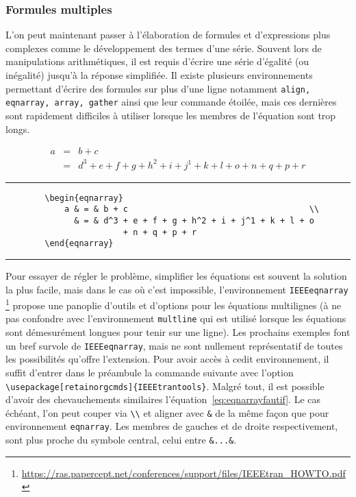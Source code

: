 \subsubsection*{Formules multiples}
L'on peut maintenant passer à l'élaboration de formules et d'expressions plus complexes comme le développement des termes d'une série. Souvent lors de manipulations arithmétiques, il est requis d'écrire une série d'égalité (ou inégalité) jusqu'à la réponse simplifiée. Il existe plusieurs environnements permettant d'écrire des formules sur plus d'une ligne notamment \verb|align, eqnarray, array, gather| ainsi que leur commande étoilée, mais ces dernières sont rapidement difficiles à utiliser lorsque les membres de l'équation sont trop longs.
%
\begin{table}[H]
	\centering
	\begin{eqnarray}
		a & = & b + c     \\
		  & = & d^3 + e + f + g + h^2 + i + j^1 + k + l + o
			      + n + q + p + r
	\label{eq:eqnarrayfautif}
	\end{eqnarray}
	\hrule
	\begin{verbatim}
		\begin{eqnarray}
			a & = & b + c                                     \\
			  & = & d^3 + e + f + g + h^2 + i + j^1 + k + l + o
					    + n + q + p + r
		\end{eqnarray}		
	\end{verbatim}
	\hrule
\end{table}
%
\par Pour essayer de régler le problème, simplifier les équations est souvent la solution la plus facile, mais dans le cas où c'est impossible, l'environnement \verb|IEEEeqnarray| \footnote{\url{https://ras.papercept.net/conferences/support/files/IEEEtran_HOWTO.pdf}} propose une panoplie d'outils et d'options pour les équations multilignes (à ne pas confondre avec l'environnement \verb|multline| qui est utilisé lorsque les équations sont démesurément longues pour tenir sur une ligne). Les prochains exemples font un bref survole de \verb|IEEEeqnarray|, mais ne sont nullement représentatif de toutes les possibilités qu'offre l'extension. Pour avoir accès à cedit environnement, il suffit d'entrer dans le préambule la commande suivante avec l'option \verb|\usepackage[retainorgcmds]{IEEEtrantools}|. Malgré tout, il est possible d'avoir des chevauchements similaires l'équation~\ref{eq:eqnarrayfautif}. Le cas échéant, l'on peut couper via \verb|\\| et aligner avec \verb|&| de la même façon que pour environnement \verb|eqnarray|. Les membres de gauches et de droite respectivement, sont plus proche du symbole central, celui entre \verb|&...&|.
